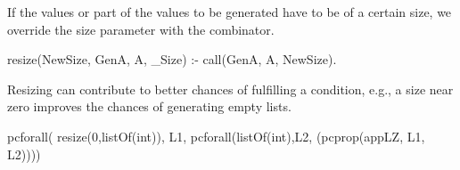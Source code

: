 





If the values or part of the values to be generated have to be of a
certain size, we override the size parameter with the 
combinator.
%
\begin{yapcode}
 resize(NewSize, GenA, A, _Size) :- call(GenA, A, NewSize).
\end{yapcode}
%
Resizing can contribute to better chances of fulfilling a condition,
e.g., a size near zero improves the chances of generating empty lists.
%
\begin{yapcode}
 pcforall(  resize(0,listOf(int)),  L1,
   pcforall(listOf(int),L2, (pcprop({appLZ, L1, L2}))))
\end{yapcode}


